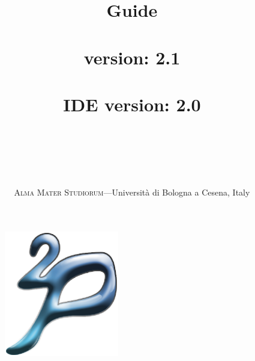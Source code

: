 \documentclass[11pt]{report}
\title{{\huge{\bf{\tuprolog{} Guide\\\mbox{ }\\}}}
        \tuprolog{} version: 2.1\\\mbox{ }\\
        \tuprolog{} IDE version: 2.0\\\mbox{ }\\
{\small{
    \lastchangesdate{2007-04-19}\\
    }}
}
\author{ \mbox{ }\\ \textsc{Alma Mater Studiorum}---Universit\`{a} di Bologna a Cesena, Italy
}
\date{}
\newcommand\logo{
    \begin{figure}[tp]
        \begin{center}
            \includegraphics[width=5cm]{images/logo}
        \end{center}
\end{figure}
}
\begin{document}
\logo

\maketitle

\tableofcontents













\end{document}
